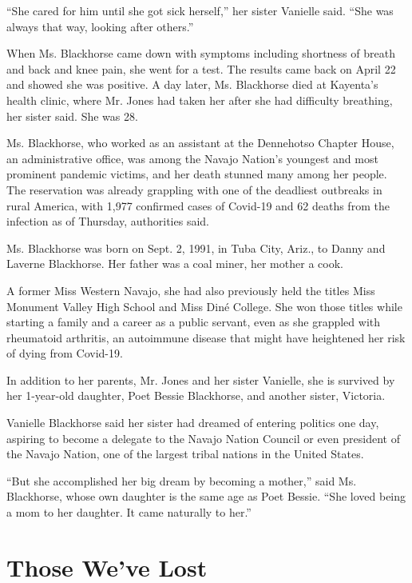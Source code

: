 ``She cared for him until she got sick herself,'' her sister Vanielle
said. ``She was always that way, looking after others.''

When Ms. Blackhorse came down with symptoms including shortness of
breath and back and knee pain, she went for a test. The results came
back on April 22 and showed she was positive. A day later, Ms.
Blackhorse died at Kayenta's health clinic, where Mr. Jones had taken
her after she had difficulty breathing, her sister said. She was 28.

Ms. Blackhorse, who worked as an assistant at the Dennehotso Chapter
House, an administrative office, was among the Navajo Nation's youngest
and most prominent pandemic victims, and her death stunned many among
her people. The reservation was already grappling with one of the
deadliest outbreaks in rural America, with 1,977 confirmed cases of
Covid-19 and 62 deaths from the infection as of Thursday, authorities
said.

Ms. Blackhorse was born on Sept. 2, 1991, in Tuba City, Ariz., to Danny
and Laverne Blackhorse. Her father was a coal miner, her mother a cook.

A former Miss Western Navajo, she had also previously held the titles
Miss Monument Valley High School and Miss Diné College. She won those
titles while starting a family and a career as a public servant, even as
she grappled with rheumatoid arthritis, an autoimmune disease that might
have heightened her risk of dying from Covid-19.

In addition to her parents, Mr. Jones and her sister Vanielle, she is
survived by her 1-year-old daughter, Poet Bessie Blackhorse, and another
sister, Victoria.

Vanielle Blackhorse said her sister had dreamed of entering politics one
day, aspiring to become a delegate to the Navajo Nation Council or even
president of the Navajo Nation, one of the largest tribal nations in the
United States.

``But she accomplished her big dream by becoming a mother,'' said Ms.
Blackhorse, whose own daughter is the same age as Poet Bessie. ``She
loved being a mom to her daughter. It came naturally to her.''

\href{https://www.nytimes.com/interactive/2020/obituaries/people-died-coronavirus-obituaries.html?action=click\&pgtype=Article\&state=default\&region=BELOW_MAIN_CONTENT\&context=covid_obits_promo}{}

\hypertarget{those-weve-lost}{%
\section{Those We've Lost}\label{those-weve-lost}}


